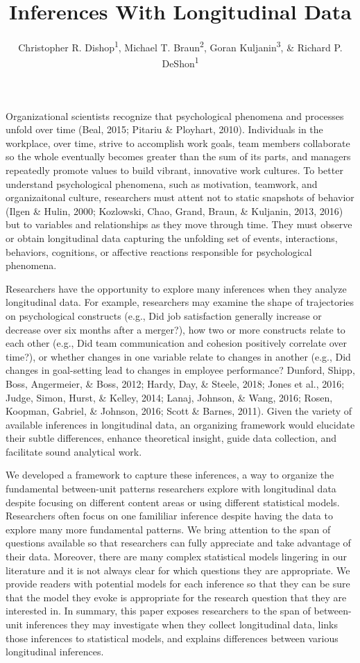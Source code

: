 \documentclass[english,,man]{apa6}
\title{Inferences With Longitudinal Data}
\author{Christopher R. Dishop\textsuperscript{1}, Michael T.
Braun\textsuperscript{2}, Goran Kuljanin\textsuperscript{3}, \& Richard
P. DeShon\textsuperscript{1}}
\date{}
\affiliation{
\vspace{0.5cm}
\textsuperscript{1} Michigan State University\\\textsuperscript{2} University of South Florida\\\textsuperscript{3} DePaul University}
\theoremstyle{definition}
\theoremstyle{definition}
\theoremstyle{definition}
\theoremstyle{remark}
\begin{document}
\maketitle

Organizational scientists recognize that psychological phenomena and
processes unfold over time (Beal, 2015; Pitariu \& Ployhart, 2010).
Individuals in the workplace, over time, strive to accomplish work
goals, team members collaborate so the whole eventually becomes greater
than the sum of its parts, and managers repeatedly promote values to
build vibrant, innovative work cultures. To better understand
psychological phenomena, such as motivation, teamwork, and
organizaitonal culture, researchers must attent not to static snapshots
of behavior (Ilgen \& Hulin, 2000; Kozlowski, Chao, Grand, Braun, \&
Kuljanin, 2013, 2016) but to variables and relationships as they move
through time. They must observe or obtain longitudinal data capturing
the unfolding set of events, interactions, behaviors, cognitions, or
affective reactions responsible for psychological phenomena.

Researchers have the opportunity to explore many inferences when they
analyze longitudinal data. For example, researchers may examine the
shape of trajectories on psychological constructs (e.g., Did job
satisfaction generally increase or decrease over six months after a
merger?), how two or more constructs relate to each other (e.g., Did
team communication and cohesion positively correlate over time?), or
whether changes in one variable relate to changes in another (e.g., Did
changes in goal-setting lead to changes in employee performance?
Dunford, Shipp, Boss, Angermeier, \& Boss, 2012; Hardy, Day, \& Steele,
2018; Jones et al., 2016; Judge, Simon, Hurst, \& Kelley, 2014; Lanaj,
Johnson, \& Wang, 2016; Rosen, Koopman, Gabriel, \& Johnson, 2016; Scott
\& Barnes, 2011). Given the variety of available inferences in
longitudinal data, an organizing framework would elucidate their subtle
differences, enhance theoretical insight, guide data collection, and
facilitate sound analytical work.

We developed a framework to capture these inferences, a way to organize
the fundamental between-unit patterns researchers explore with
longitudinal data despite focusing on different content areas or using
different statistical models. Researchers often focus on one famililiar
inference despite having the data to explore many more fundamental
patterns. We bring attention to the span of questions available so that
researchers can fully appreciate and take advantage of their data.
Moreover, there are many complex statistical models lingering in our
literature and it is not always clear for which questions they are
appropriate. We provide readers with potential models for each inference
so that they can be sure that the model they evoke is appropriate for
the research question that they are interested in. In summary, this
paper exposes researchers to the span of between-unit inferences they
may investigate when they collect longitudinal data, links those
inferences to statistical models, and explains differences between
various longitudinal inferences.
\end{document}
